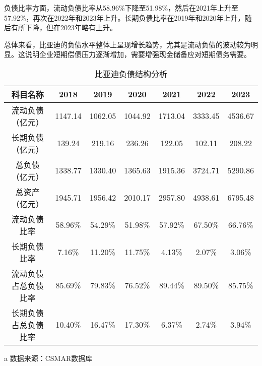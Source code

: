 负债比率方面，流动负债比率从58.96\%下降至51.98\%，然后在2021年上升至57.92\%，再次在2022年和2023年上升。长期负债比率在2019年和2020年上升，随后有所下降，但在2023年略有上升。

总体来看，比亚迪的负债水平整体上呈现增长趋势，尤其是流动负债的波动较为明显。这说明企业短期偿债压力逐渐增加，需要增强现金储备应对短期债务需要。
\begin{table}
  \centering
  \begin{threeparttable}[c]
    \caption{比亚迪负债结构分析}
    \label{tab:debt-structure}
    \begin{tabular}{ccccccc}
      \toprule
        科目名称 & 2018 & 2019 & 2020 & 2021 & 2022 & 2023 \\ 
      \midrule
        流动负债（亿元） & 1147.14  & 1062.05  & 1044.92  & 1713.04  & 3333.45  & 4536.67  \\ 
        长期负债（亿元） & 139.24  & 219.16  & 236.26  & 122.05  & 102.11  & 208.22  \\ 
        总负债（亿元） & 1338.77  & 1330.40  & 1365.63  & 1915.36  & 3724.71  & 5290.86  \\ 
        总资产（亿元） & 1945.71  & 1956.42  & 2010.17  & 2957.80  & 4938.61  & 6795.48  \\ 
        流动负债比率 & 58.96\% & 54.29\% & 51.98\% & 57.92\% & 67.50\% & 66.76\% \\ 
        长期负债比率 & 7.16\% & 11.20\% & 11.75\% & 4.13\% & 2.07\% & 3.06\% \\ 
        流动负债占总负债比率 & 85.69\% & 79.83\% & 76.52\% & 89.44\% & 89.50\% & 85.75\% \\ 
        长期负债占总负债比率 & 10.40\% & 16.47\% & 17.30\% & 6.37\% & 2.74\% & 3.94\% \\ 
      \bottomrule
    \end{tabular}
    \begin{tablenotes}
      \item [a] 数据来源：CSMAR数据库
    \end{tablenotes}
  \end{threeparttable}
\end{table}

